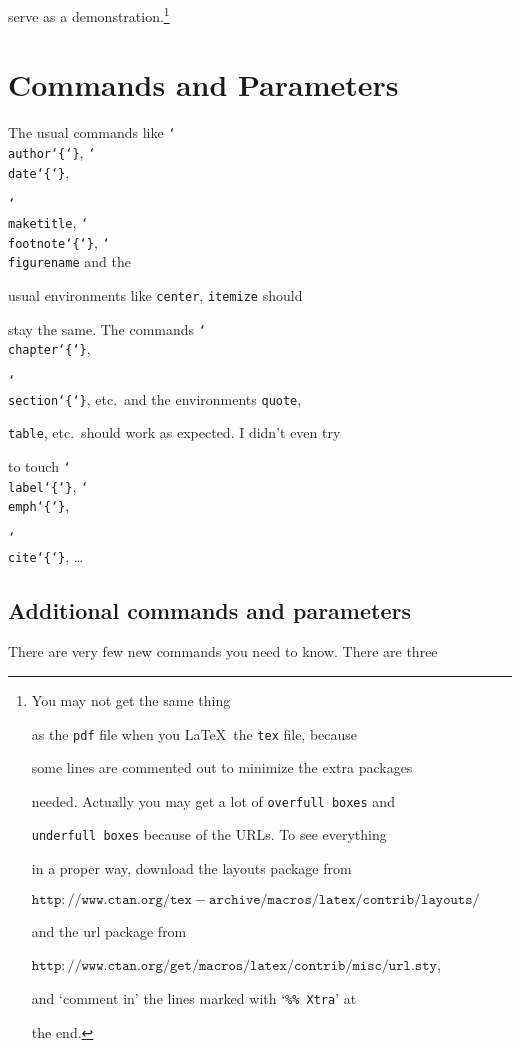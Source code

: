 \documentclass{bhamthesis}
\newcommand{\bksl}{\char`\\}
\newcommand{\cmd}[1]{\texttt{\bksl{}#1}}
\newcommand{\pkg}[1]{\textsf{#1}}
\newcommand{\env}[1]{\texttt{#1}}
\newcommand{\ext}[1]{\texttt{#1}}
\newcommand{\textarg}{\char`\{\char`\}}
\providecommand{\url}[1]{\(\mathtt{#1}\)}
\begin{document}
serve as a demonstration.\footnote{You may not get the same thing

as the \ext{pdf} file when you \LaTeX\ the \ext{tex} file, because

some lines are commented out to minimize the extra packages

needed.  Actually you may get a lot of \texttt{overfull boxes} and

\texttt{underfull boxes} because of the URLs.  To see everything

in a proper way, download the \pkg{layouts} package from

\url{http://www.ctan.org/tex-archive/macros/latex/contrib/layouts/}

and the \pkg{url} package from

\url{http://www.ctan.org/get/macros/latex/contrib/misc/url.sty},

and `comment in' the lines marked with `\;\texttt{\%\% Xtra}\;' at

the end.}





\chapter{Commands and Parameters}\label{ch:cmd+param}

The usual commands like \cmd{author\textarg}, \cmd{date\textarg},

\cmd{maketitle}, \cmd{footnote\textarg}, \cmd{figurename} and the

usual environments like \env{center}, \env{itemize} should

stay the same.  The commands \cmd{chapter\textarg},

\cmd{section\textarg}, etc.\ and the environments \env{quote},

\env{table}, etc.\ should work as expected.  I didn't even try

to touch \cmd{label\textarg}, \cmd{emph\textarg},

\cmd{cite\textarg}, \ldots



\section{Additional commands and parameters}\label{sec:add-cmds}

There are very few new commands you need to know.  There are three
\end{document}
